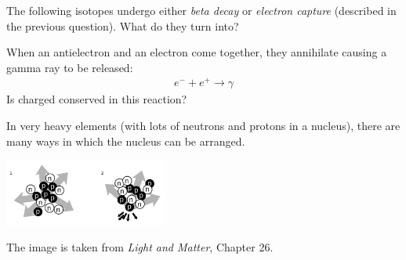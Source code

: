 \documentclass[12pt]{exam}
\begin{document}
\begin{questions}
	\question The following isotopes undergo either \textit{beta decay} or \textit{electron capture} (described in the previous question). What do they turn into?
	
	\question When an antielectron and an electron come together, they annihilate causing a gamma ray to be released:
	\begin{eqnarray}
	e^- + e^+ \rightarrow \gamma \nonumber
	\end{eqnarray}
	Is charged conserved in this reaction?
	\vspace{0.3in}
	
	\clearpage
	\question In very heavy elements (with lots of neutrons and protons in a nucleus), there are many ways in which the nucleus can be arranged.
	\begin{center}
	\includegraphics[width=0.4\textwidth]{../images/nucleotide_arrangements.png}
\end{center}	
The image is taken from \textit{Light and Matter}, Chapter 26.
\begin{parts}

\end{parts}
\end{questions}
\end{document}

